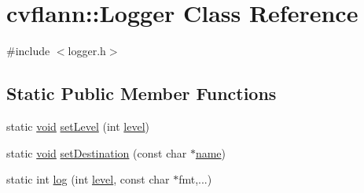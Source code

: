 \hypertarget{classcvflann_1_1Logger}{\section{cvflann\-:\-:Logger Class Reference}
\label{classcvflann_1_1Logger}
}


{\ttfamily \#include $<$logger.\-h$>$}

\subsection*{Static Public Member Functions}
\begin{DoxyCompactItemize}
\item 
static \hyperlink{legacy_8hpp_a8bb47f092d473522721002c86c13b94e}{void} \hyperlink{classcvflann_1_1Logger_a6359b7626c1a7330add2adc3acae8124}{set\-Level} (int \hyperlink{tracking_8hpp_ac693e272fb1883fe0343f55a14d72b22}{level})
\item 
static \hyperlink{legacy_8hpp_a8bb47f092d473522721002c86c13b94e}{void} \hyperlink{classcvflann_1_1Logger_a5b152ba768c1b3efcad4faf40f66a2f1}{set\-Destination} (const char $\ast$\hyperlink{core__c_8h_add928d8eb85ea33a25a67db3406d4887}{name})
\item 
static int \hyperlink{classcvflann_1_1Logger_abbba282ad319f1b8d6864807608e5351}{log} (int \hyperlink{tracking_8hpp_ac693e272fb1883fe0343f55a14d72b22}{level}, const char $\ast$fmt,...)
\end{DoxyCompactItemize}



